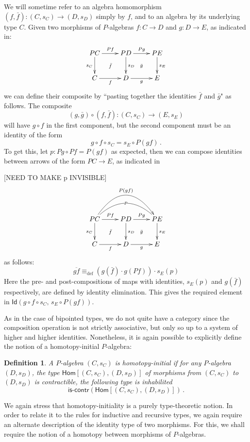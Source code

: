 \documentclass[reqno,10pt,a4paper,oneside]{amsart}
\numberwithin{equation}{section}
\theoremstyle{mythm}
\theoremstyle{mydef}
\newtheorem{definition}[theorem]{Definition}
\theoremstyle{myrmk}
\newcommand{\ie}{\text{i.e.\ }}
\newcommand{\deq}{\equiv}
\newcommand{\defeq}{\deq_{\mathrm{def}}}
\newcommand{\co}{\colon}
\newcommand{\iscontr}{\mathsf{is}\text{-}\mathsf{contr}}
\newcommand{\Id}{\mathsf{Id}}
\newcommand{\Hom}{\mathsf{Hom}}
\begin{document}
We will sometime refer to an algebra homomorphism $(f, \bar{f}) : (C, s_C) \rightarrow (D, s_D)$ simply by $f$, and to an algebra by its underlying type $C$.
Given two morphisms of $P$-algebras $f \co C \to D$ and $g \co D \to E$, as indicated in:
\[
\xymatrix{
 PC \ar[d]_{s_C} \ar[r]^{Pf}  \ar@{}[dr]|{\bar{f}} &  PD \ar[d]^{s_D}  \ar[r]^{Pg}  \ar@{}[dr]|{\bar{g}} &  PE \ar[d]^{s_E} \\
C \ar[r]_{f}   & D \ar[r]_{g}   & E }
\]
we can define their composite by ``pasting together the identities $\bar{f}$ and $\bar{g}$" as follows.
The composite $$(g, \bar{g}) \circ (f, \bar{f}) \co (C,s_C) \to (E,s_E)$$ will have $g\circ f$ in the first component, but the second component must be an identity of the form
\[
g\circ f\circ s_C = s_E\circ P(gf)\, .
\]
To get this, let $p : Pg\circ Pf = P(gf)$ as expected, then we can compose identities between arrows of the form $PC \to E$, as indicated in

[NEED TO MAKE p INVISIBLE]
\[
\xymatrix{
 PC \ar[d]_{s_C} \ar[r]^{Pf}  \ar@{}[dr]|{\bar{f}} \ar@{}@/^2pc/[rr]|{p} \ar@/^3pc/[rr]^{P(gf)} &  PD \ar[d]^{s_D}  \ar[r]^{Pg}  \ar@{}[dr]|{\bar{g}} &  PE \ar[d]^{s_E} \\
C \ar[r]_{f}   & D \ar[r]_{g}   & E }
\]
as follows:
\[
\overline{gf} \defeq (g(\bar{f})\cdot g(Pf))\cdot s_E(p)
\]
Here the pre- and post-compositions of maps with identities, $s_E(p)$ and $g(\bar{f})$ respectively, are defined by identity elimination.
This gives the required  element in $\Id(g\circ f\circ s_C ,\, s_E\circ P(gf))$.

As in the case of bipointed types, we do not quite have a category since the composition operation is not strictly associative, but only so up to a system of higher and higher identities. 
Nonetheless, it is again possible to explicitly define the notion of a homotopy-initial $P$-algebra:

\begin{definition}\label{def:AlgInit}
A $P$-algebra $(C, s_C)$ is  \emph{homotopy-initial}  if for any $P$-algebra $(D,s_D)$, the type $\Hom[(C, s_C),(D,s_D)]$ of morphisms from $(C, s_C)$ to $(D,s_D)$
is contractible, \ie the following type is inhabilited
\[
 \iscontr(\Hom[(C, s_C),(D,s_D)]) \, .
\]  
\end{definition}

We again stress that homotopy-initiality is a purely type-theoretic notion. In order to relate it to the rules for inductive and recursive types, we again require an alternate description of the identity type of two morphisms. For this, we shall require the notion of a homotopy between morphisms of $P$-algebras. 
\end{document}

